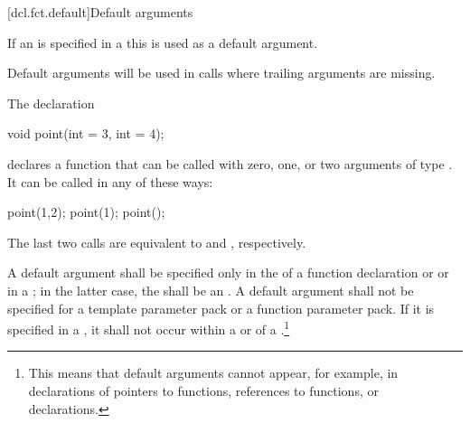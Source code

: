 [dcl.fct.default]{Default arguments}%

\pnum
If an  is specified in a
 this
is used as a default argument.
\begin{note}
Default arguments will be used in calls
where trailing arguments are missing.
\end{note}

\pnum
{}%
\begin{example}
The declaration

\begin{codeblock}
void point(int = 3, int = 4);
\end{codeblock}

declares a function that can be called with zero, one, or two arguments of type
.
It can be called in any of these ways:

\begin{codeblock}
point(1,2);  point(1);  point();
\end{codeblock}

The last two calls are equivalent to
and
,
respectively.
\end{example}

\pnum
A default argument shall be specified only in the
of a function declaration
or 
or in a
;
in the latter case, the  shall be an
.
A default argument shall not be specified for
a template parameter pack or
a function parameter pack.
If it is specified in a
,
it shall not occur within a
or
of a
.\footnote{This means that default
arguments cannot appear,
for example, in declarations of pointers to functions,
references to functions, or
declarations.
}

